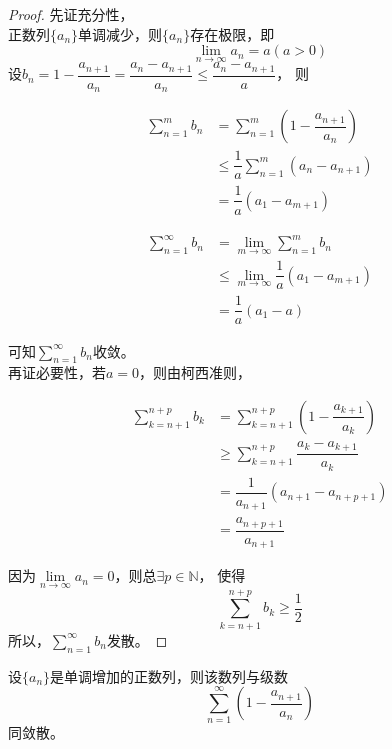 \begin{proof}
    
    先证充分性，\\
    正数列$\{a_n\}$单调减少，则$\{a_n\}$存在极限，即
    $$\lim_{n\to\infty}{a_n} = a(a>0)$$
    设$b_n=1-\dfrac{a_{n+1}}{a_n} = \dfrac{a_n-a_{n+1}}{a_n}\leq\dfrac{a_n-a_{n+1}}{a}$，
    则

    \begin{align*}
        \sum_{n=1}^{m}{b_n}&=\sum_{n=1}^{m}{(1-\dfrac{a_{n+1}}{a_{n}})}\\
        &\leq\dfrac{1}{a}\sum_{n=1}^{m}{(a_n-a_{n+1})}\\
        &=\dfrac{1}{a}(a_1-a_{m+1})
    \end{align*}

    \begin{align*}
        \sum_{n=1}^{\infty}{b_n} &= \lim_{m\to\infty}{\sum_{n=1}^{m}{b_n}}\\
        &\leq\lim_{m\to\infty}{\dfrac{1}{a}(a_1-a_{m+1})}\\
        & = \dfrac{1}{a}(a_1-a)
    \end{align*}

    可知$\sum\limits_{n=1}^{\infty}{b_n}$收敛。\\
    再证必要性，若$a=0$，则由柯西准则，

    \begin{align*}
        \sum_{k=n+1}^{n+p}{b_k} &= \sum_{k=n+1}^{n+p}{(1-\dfrac{a_{k+1}}{a_k})}\\
        &\geq\sum_{k=n+1}^{n+p}{\dfrac{a_k-a_{k+1}}{a_k}}\\
        & = \dfrac{1}{a_{n+1}}(a_{n+1}-a_{n+p+1})\\
        & = \dfrac{a_{n+p+1}}{a_{n+1}}
    \end{align*}

    因为$\lim\limits_{n\to\infty}{a_n}=0$，则总$\exists p \in \mathbb{N}$，
    使得
    $$\sum_{k=n+1}^{n+p}{b_k}\geq\dfrac{1}{2}$$
    所以，$\sum\limits_{n=1}^{\infty}{b_n}$发散。

\end{proof}

\begin{theorem}

    设$\{a_n\}$是单调增加的正数列，则该数列与级数
    $$\sum\limits_{n=1}^{\infty}{(1-\dfrac{a_{n+1}}{a_n})}$$
    同敛散。
        
\end{theorem}

